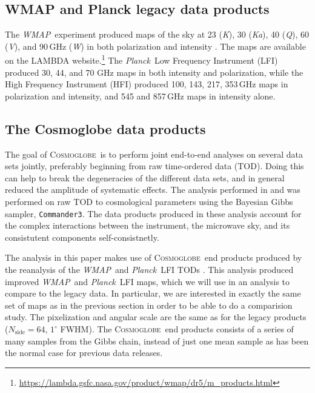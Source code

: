 \documentclass[twocolumn]{../../common/aa}
\def\WMAP{\emph{WMAP}}
\def\Planck{\emph{Planck}}
\def\commanderthree{\texttt{Commander3}}
\newcommand{\cosmoglobe}{\textsc{Cosmoglobe}}
\newcommand{\Cosmoglobe}{\textsc{Cosmoglobe}}
\newcommand{\K}[0]{\textit K}
\newcommand{\Ka}[0]{\textit{Ka}}
\newcommand{\Q}[0]{\textit Q}
\newcommand{\V}[0]{\textit V}
\newcommand{\W}[0]{\textit W}
\begin{document}
\subsection{WMAP and Planck legacy data products}
\label{sec:wmap_data}


The \WMAP\ experiment produced maps of the sky at 23 (\K), 30 (\Ka), 40 (\Q), 60 (\V), and 90\,GHz (\W) in both polarization and intensity \citep{bennett2012}.
The maps are available on the LAMBDA website.\footnote{\url{https://lambda.gsfc.nasa.gov/product/wmap/dr5/m_products.html}} 
The \Planck\ Low Frequency Instrument (LFI) produced  30, 44, and 70 GHz maps in both intensity and polarization, while the High Frequency Instrument (HFI) produced 100, 143, 217, 353\,GHz maps in polarization and intensity, and 545 and 857\,GHz maps in intensity alone.

\subsection{The Cosmoglobe data products}
\label{sec:cosmoglobe_data}

The goal of \Cosmoglobe\ is to perform joint end-to-end analyses on several data sets jointly, preferably beginning from raw time-ordered data (TOD). Doing this can help to break the degeneracies of the different data sets, and in general reduced the amplitude of systematic effects. The analysis performed in \citet{bp01} and \citet{watts2023_dr1} was performed on raw TOD to cosmological parameters using the Bayesian Gibbs sampler, \commanderthree. The data products produced in these analysis account for the complex interactions between the instrument, the microwave sky, and its consistutent components self-consistnetly.

The analysis in this paper makes use of \cosmoglobe\ end products produced by the reanalysis of the \WMAP\ and \Planck\ LFI TODs \citep{watts2023_dr1}. This analysis produced improved \WMAP\ and \Planck\ LFI maps, which we will use in an analysis to compare to the legacy data. In particular, we are interested in exactly the same set of maps as in the previous section in order to be able to do a comparision study. The pixelization and angular scale are the same as for the legacy products ($N_\textrm{side}=64$, $1^\circ$ FWHM). The \cosmoglobe\ end products consists of a series of many samples from the Gibbs chain, instead of just one mean sample as has been the normal case for previous data releases.
\end{document}
